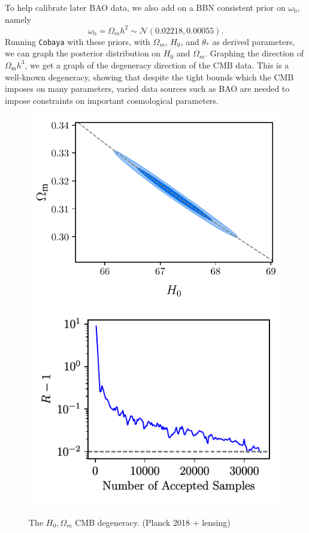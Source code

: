 \documentclass{lkx_paper}
\renewcommand{\b}{{\mathrm{b}}}
\newcommand{\m}{{\mathrm{m}}}
\newcommand{\NN}{{\mathcal{N}}}
\begin{document}
To help calibrate later BAO data, we also add on a BBN consistent prior on $\omega_\b$, namely
\[
    \omega_\b =\Omega_m h^2 \sim \NN(0.02218, 0.00055).
\]
Running \texttt{Cobaya} with these priors, with $\Omega_m$, $H_0$, and $\theta_*$ as derived parameters, we can graph the posterior distribution on $H_0$ and $\Omega_m$. Graphing the direction of $\Omega_\m h^3$, we get a graph of the degeneracy direction of the CMB data. This is a well-known degeneracy, showing that despite the tight bounds which the CMB imposes on many parameters, varied data sources such as BAO are needed to impose constraints on important cosmological parameters.
\begin{figure}[H]
  \centering
  \includegraphics[scale=0.8]{figures/CMB-H0-omegam.pdf}
  \includegraphics{figures/CMB-R-1.pdf}
  \caption{The $H_0,\Omega_m$ CMB degeneracy. (Planck 2018 + lensing)}
\end{figure}
\end{document}
